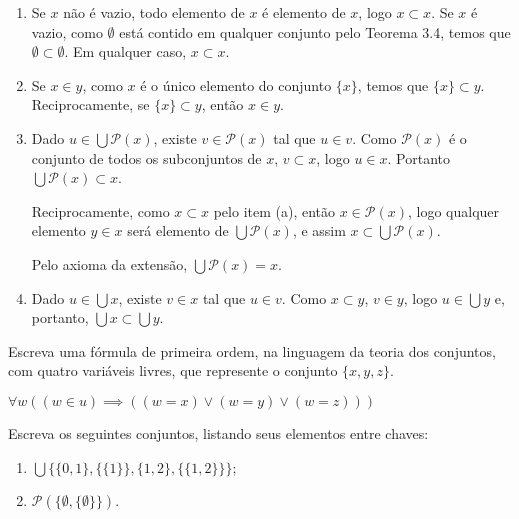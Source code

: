 \begin{enumerate}[label=(\alph{*})]
	\item 
		\begin{solucao} 
			Se $x$ não é vazio, todo elemento de $x$ é elemento de $x$, logo $x\subset x$. Se $x$ é vazio, como $\emptyset$ está contido em qualquer conjunto pelo Teorema 3.4, temos que $\emptyset\subset \emptyset$. Em qualquer caso, $x\subset x$. 
		\end{solucao}
	\item 
		\begin{solucao}
			Se $x\in y$, como $x$ é o único elemento do conjunto $\{x\}$, temos que $\{x\}\subset y$. Reciprocamente, se $\{x\}\subset y$, então $x\in y$.
		\end{solucao}
	\item 
		\begin{solucao}
			Dado $u\in\bigcup\mathcal{P}(x)$, existe $v\in\mathcal{P}(x)$ tal que $u\in v$. Como $\mathcal{P}(x)$ é o conjunto de todos os subconjuntos de $x$, $v\subset x$, logo $u\in x$. Portanto $\bigcup\mathcal{P}(x)\subset x$.
			
			Reciprocamente, como $x\subset x$ pelo item (a), então $x\in\mathcal{P}(x)$, logo qualquer elemento $y\in x$ será elemento de $\bigcup\mathcal{P}(x)$, e assim $x\subset \bigcup\mathcal{P}(x)$.
			
			Pelo axioma da extensão, $\bigcup\mathcal{P}(x)=x$.
		\end{solucao}
	\item 
		\begin{solucao}
			Dado $u\in\bigcup x$, existe $v\in x$ tal que $u\in v$. Como $x\subset y$, $v\in y$, logo $u\in\bigcup y$ e, portanto, $\bigcup x\subset\bigcup y$.
		\end{solucao}
\end{enumerate}


\begin{exercicio}
	Escreva uma fórmula de primeira ordem, na linguagem da teoria dos conjuntos, com quatro variáveis livres, que represente o conjunto $\{x,y,z\}$.
\end{exercicio}
\begin{solucao}
	$\forall w ((w \in u) \implies ((w=x) \vee (w=y) \vee (w=z)))$
\end{solucao}

\begin{exercicio}
	Escreva os seguintes conjuntos, listando seus elementos entre chaves:
	\begin{enumerate}[label=(\alph{*})]
		\item $\bigcup\{\{0,1\},\{\{1\}\},\{1,2\},\{\{1,2\}\}\}$;
		\item $\mathcal{P}(\{\emptyset,\{\emptyset\}\})$.
	\end{enumerate}
\end{exercicio}


